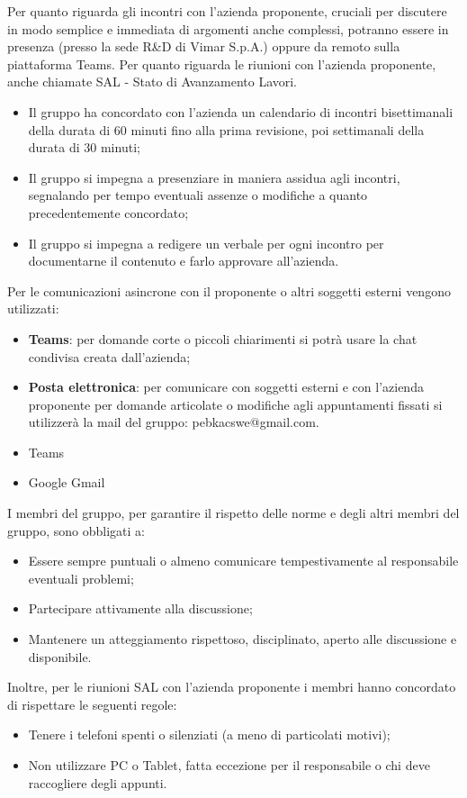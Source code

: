 Per quanto riguarda gli incontri con l'azienda proponente, cruciali per discutere in modo semplice e immediata di argomenti anche complessi, potranno essere in presenza (presso la sede R\&D di Vimar S.p.A.) oppure da remoto sulla piattaforma Teams. Per quanto riguarda le riunioni con l'azienda proponente, anche chiamate SAL - Stato di Avanzamento Lavori.
\begin{itemize}
    \item Il gruppo ha concordato con l'azienda un calendario di incontri bisettimanali della durata di 60 minuti fino alla prima revisione, poi settimanali della durata di 30 minuti;
    \item Il gruppo si impegna a presenziare in maniera assidua agli incontri, segnalando per tempo eventuali assenze o modifiche a quanto precedentemente concordato;
    \item Il gruppo si impegna a redigere un verbale per ogni incontro per documentarne il contenuto e farlo approvare all'azienda. 
\end{itemize}
Per le comunicazioni asincrone con il proponente o altri soggetti esterni vengono utilizzati:
\begin{itemize}
    \item \textbf{Teams}: per domande corte o piccoli chiarimenti si potrà usare la chat condivisa creata dall'azienda;
    \item \textbf{Posta elettronica}: per comunicare con soggetti esterni e con l'azienda proponente per domande articolate o modifiche agli appuntamenti fissati si utilizzerà la mail del gruppo: pebkacswe@gmail.com.
\end{itemize}
\begin{itemize}
    \item Teams
    \item Google Gmail
\end{itemize}


I membri del gruppo, per garantire il rispetto delle norme e degli altri membri del gruppo, sono obbligati a:
\begin{itemize}
    \item Essere sempre puntuali o almeno comunicare tempestivamente al responsabile eventuali problemi;
    \item Partecipare attivamente alla discussione;
    \item Mantenere un atteggiamento rispettoso, disciplinato, aperto alle discussione e disponibile.
\end{itemize}
Inoltre, per le riunioni SAL con l'azienda proponente i membri hanno concordato di rispettare le seguenti regole:
\begin{itemize}
    \item Tenere i telefoni spenti o silenziati (a meno di particolati motivi);
    \item Non utilizzare PC o Tablet, fatta eccezione per il responsabile o chi deve raccogliere degli appunti.
\end{itemize}